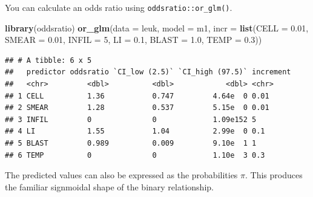 \documentclass[
]{book}
\newenvironment{Shaded}{\begin{snugshade}}{\end{snugshade}}
\newcommand{\DataTypeTok}[1]{\textcolor[rgb]{0.13,0.29,0.53}{#1}}
\newcommand{\DecValTok}[1]{\textcolor[rgb]{0.00,0.00,0.81}{#1}}
\newcommand{\FloatTok}[1]{\textcolor[rgb]{0.00,0.00,0.81}{#1}}
\newcommand{\KeywordTok}[1]{\textcolor[rgb]{0.13,0.29,0.53}{\textbf{#1}}}
\newcommand{\NormalTok}[1]{#1}
\newcommand{\OperatorTok}[1]{\textcolor[rgb]{0.81,0.36,0.00}{\textbf{#1}}}
\newcommand{\StringTok}[1]{\textcolor[rgb]{0.31,0.60,0.02}{#1}}
\begin{document}
You can calculate an odds ratio using \texttt{oddsratio::or\_glm()}.

\begin{Shaded}
\begin{Highlighting}[]
\KeywordTok{library}\NormalTok{(oddsratio)}
\KeywordTok{or_glm}\NormalTok{(}\DataTypeTok{data =}\NormalTok{ leuk, }
       \DataTypeTok{model =}\NormalTok{ m1, }
       \DataTypeTok{incr =} \KeywordTok{list}\NormalTok{(}\DataTypeTok{CELL =} \FloatTok{0.01}\NormalTok{, }
                   \DataTypeTok{SMEAR =} \FloatTok{0.01}\NormalTok{, }
                   \DataTypeTok{INFIL =} \DecValTok{5}\NormalTok{, }
                   \DataTypeTok{LI =} \FloatTok{0.1}\NormalTok{, }
                   \DataTypeTok{BLAST =} \FloatTok{1.0}\NormalTok{, }
                   \DataTypeTok{TEMP =} \FloatTok{0.3}\NormalTok{))}
\end{Highlighting}
\end{Shaded}

\begin{verbatim}
## # A tibble: 6 x 5
##   predictor oddsratio `CI_low (2.5)` `CI_high (97.5)` increment
##   <chr>         <dbl>          <dbl>            <dbl> <chr>    
## 1 CELL          1.36           0.747         4.64e  0 0.01     
## 2 SMEAR         1.28           0.537         5.15e  0 0.01     
## 3 INFIL         0              0             1.09e152 5        
## 4 LI            1.55           1.04          2.99e  0 0.1      
## 5 BLAST         0.989          0.009         9.10e  1 1        
## 6 TEMP          0              0             1.10e  3 0.3
\end{verbatim}

The predicted values can also be expressed as the probabilities \(\pi\). This produces the familiar signmoidal shape of the binary relationship.

\begin{Shaded}
\end{Shaded}
\end{document}
